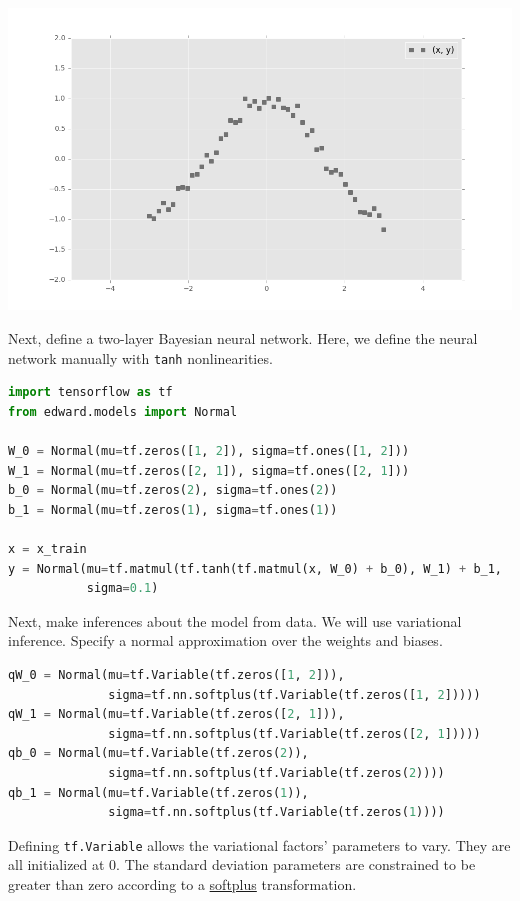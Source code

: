 \includegraphics[width=700px]{images/getting-started-fig0.png}

Next, define a two-layer Bayesian neural network. Here, we
define the neural network manually with \texttt{tanh} nonlinearities.

\begin{lstlisting}[language=Python]
import tensorflow as tf
from edward.models import Normal

W_0 = Normal(mu=tf.zeros([1, 2]), sigma=tf.ones([1, 2]))
W_1 = Normal(mu=tf.zeros([2, 1]), sigma=tf.ones([2, 1]))
b_0 = Normal(mu=tf.zeros(2), sigma=tf.ones(2))
b_1 = Normal(mu=tf.zeros(1), sigma=tf.ones(1))

x = x_train
y = Normal(mu=tf.matmul(tf.tanh(tf.matmul(x, W_0) + b_0), W_1) + b_1,
           sigma=0.1)
\end{lstlisting}

Next, make inferences about the model from data. We will use variational
inference. Specify a normal approximation over the weights and biases.

\begin{lstlisting}[language=Python]
qW_0 = Normal(mu=tf.Variable(tf.zeros([1, 2])),
              sigma=tf.nn.softplus(tf.Variable(tf.zeros([1, 2]))))
qW_1 = Normal(mu=tf.Variable(tf.zeros([2, 1])),
              sigma=tf.nn.softplus(tf.Variable(tf.zeros([2, 1]))))
qb_0 = Normal(mu=tf.Variable(tf.zeros(2)),
              sigma=tf.nn.softplus(tf.Variable(tf.zeros(2))))
qb_1 = Normal(mu=tf.Variable(tf.zeros(1)),
              sigma=tf.nn.softplus(tf.Variable(tf.zeros(1))))
\end{lstlisting}

Defining \texttt{tf.Variable} allows the variational factors'
parameters to vary. They are all initialized at 0. The standard
deviation parameters are constrained to be greater than zero according
to a
\href{https://en.wikipedia.org/wiki/Rectifier_(neural_networks)}{softplus}
transformation.

